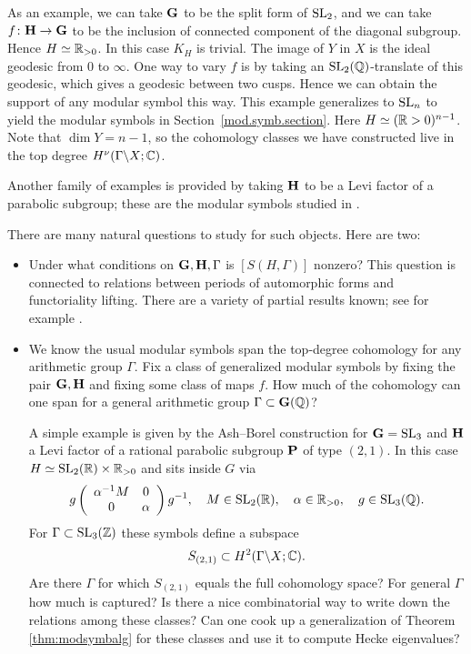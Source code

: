 As an example, we can take $\mathbf{G}$ to be the split form of $\operatorname{SL}_{2}$,
and we can take $f \colon \mathbf{H} \rightarrow \mathbf{G} $ to be the inclusion of
connected component of the diagonal subgroup.  Hence $H \simeq
\mathbb{R}_{>0}$.  In this case $K_{H}$ is trivial.  The image of $Y$ in $X$
is the ideal geodesic from $0$ to $\infty$.  One way to vary $f$ is by
taking an $\operatorname{SL}_{2} (\mathbb{Q})$-translate of this geodesic, which gives a
geodesic between two cusps.  Hence we can obtain the support of any
modular symbol this way.  This example generalizes to $\operatorname{SL}_{n}$ to
yield the modular symbols in Section~\ref{mod.symb.section}.  Here $H \simeq
(\mathbb{R} >0)^{n-1}$.  Note that $\dim Y = n-1$, so the cohomology classes
we have constructed live in the top degree $H^{\nu} (\Gamma \backslash
X; \mathbb{C})$.

Another family of examples is provided by taking $\mathbf{H}$ to be a Levi
factor of a parabolic subgroup; these are the modular symbols studied
in \cite{ash.borel}.

There are many natural questions to study for such objects.  Here are
two:

\begin{itemize}
\item Under what conditions on $\mathbf{G} , \mathbf{H} , \Gamma$ is $[S
(H,\Gamma)]$ nonzero?  This question is connected to relations between periods
of automorphic forms and functoriality lifting.  There are a variety
of partial results known; see for example \cite{venky.speh, ash.ginzburg.rallis}.
\item We know the usual modular symbols span the top-degree cohomology
for any arithmetic group $\Gamma$.  Fix a class of generalized modular
symbols by fixing the pair $\mathbf{G} , \mathbf{H} $ and fixing some class of maps
$f$.  How much of the cohomology can one span for a general arithmetic
group $\Gamma \subset \mathbf{G} (\mathbb{Q})$?

A simple example is given by the Ash--Borel construction for $\mathbf{G} =
\operatorname{SL}_{3}$ and $\mathbf{H}$ a Levi factor of a rational parabolic subgroup
$\mathbf{P}$ of type $(2,1)$.  In this case $H \simeq \operatorname{SL}_{2} (\mathbb{R}) \times
\mathbb{R}_{>0}$ and sits inside $G$ via
\[
g\left( 
\begin{array}{cc}
\alpha^{-1}M&0\\
0&\alpha
\end{array}\right)g^{-1}, \quad M\in \operatorname{SL}_{2} (\mathbb{R}), \quad \alpha \in
\mathbb{R}_{>0}, \quad g \in \operatorname{SL}_{3} (\mathbb{Q}).
\]
For $\Gamma \subset \operatorname{SL}_{3} (\mathbb{Z})$ these symbols define a subspace 
\[
S_{(2,1)}\subset H^{2} (\Gamma
\backslash X; \mathbb{C}).
\]
Are there $\Gamma $ for which $S_{(2,1)}$ equals
the full cohomology space?  For general $\Gamma$ how much is
captured?  Is there
a nice combinatorial way to write down the relations among these
classes?  Can one cook up a generalization of Theorem
\ref{thm:modsymbalg} for these classes and use it to compute Hecke
eigenvalues?

\end{itemize}


